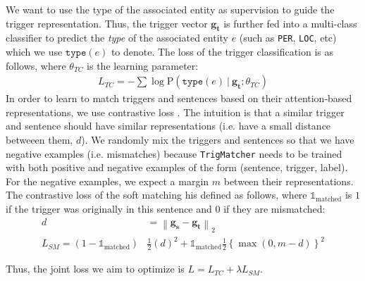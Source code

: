 We want to use the type of the associated entity as supervision to guide the trigger representation.
Thus, the trigger vector $\mathbf{g_t}$ is further fed into a multi-class classifier to predict the \textit{type} of the associated entity $e$ (such as \texttt{PER}, \texttt{LOC}, etc) which we use $\texttt{type}(e)$ to denote.
The loss of the trigger classification is as follows, where $\theta_{TC}$ is the learning parameter:
{
	{
		\begin{align*} 
		L_{TC}=-\sum \log \mathrm{P} \left(\texttt{type}(e)~|~ \mathbf{g_t}; \theta_{TC}\right) %
		\end{align*} 
	}
}  
In order to learn to match triggers and sentences based on their attention-based representations, we use contrastive loss \citep{hadsell2006dimensionality}.
The intuition is that a similar trigger and sentence should have similar representations (i.e. have a small distance betweeen them, $d$).
We randomly mix the triggers and sentences so that we have negative examples (i.e. mismatches) because \texttt{TrigMatcher} needs to be trained with both positive and negative examples of the form (sentence, trigger, label). For the negative examples, we expect a margin $m$ between their representations. The contrastive loss of the soft matching his defined as follows, where $\mathds{1}_{\text{matched}}$ is $1$ if the trigger was originally in this sentence and $0$ if they are mismatched:
{
	{
		\begin{align*}  
		d&=\left\|\mathbf{g_s}-\mathbf{g_t}\right\|_{2}\\
			L_{SM} = (1-\mathds{1}_{\text{matched}}) &\frac{1}{2}\left(d\right)^{2}+\mathds{1}_{\text{matched}} \frac{1}{2}\left\{\max \left(0, m-d\right)\right\}^{2}
		\end{align*} 
	}
}  

Thus, the joint loss we aim to optimize is $L = L_{TC} + \lambda L_{SM}$. %



